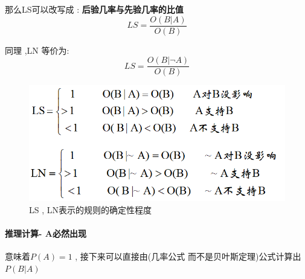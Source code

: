 \documentclass[UTF8,a4paper]{ctexart}
\begin{document}
那么LS可以改写成 : \textbf{后验几率与先验几率的比值}
\[LS = \frac{O(B|A)}{O(B)}\]

同理 ,LN 等价为:
\[LS = \frac{O(B|\lnot A)}{O(B)}\]

\begin{figure}[H]
	\centering
	\includegraphics[scale = 0.3]{assets/ArtificialIntelligence/2018-01-08-23-45-51.png}
	\caption{LS , LN表示的规则的确定性程度}
\end{figure}

\paragraph{推理计算- A必然出现} 意味着$P(A) = 1$ , 接下来可以直接由(几率公式 而不是贝叶斯定理)公式计算出 $P(B|A)$
\end{document}
